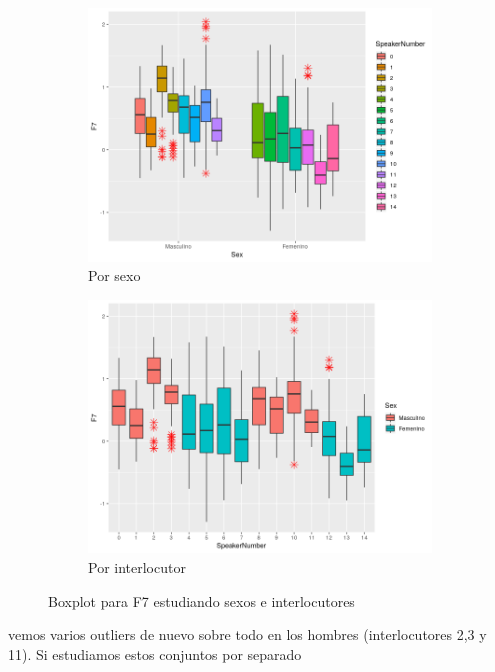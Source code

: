 \begin{figure}[H]
	\centering
	\begin{subfigure}{.5\textwidth}
		\centering
		\includegraphics[width=.9\linewidth]{bps7.png}
		\caption{Por sexo}
		\label{fig:bps7}
	\end{subfigure}%
	\begin{subfigure}{.5\textwidth}
		\centering
		\includegraphics[width=.9\linewidth]{bpsn7.png}
		\caption{Por interlocutor}
		\label{fig:bpsn7}
	\end{subfigure}
	\caption{Boxplot para F7 estudiando sexos e interlocutores}
	\label{fig:bf7}
\end{figure}

vemos varios outliers de nuevo sobre todo en los hombres (interlocutores 2,3 y 11). Si estudiamos estos conjuntos por separado


